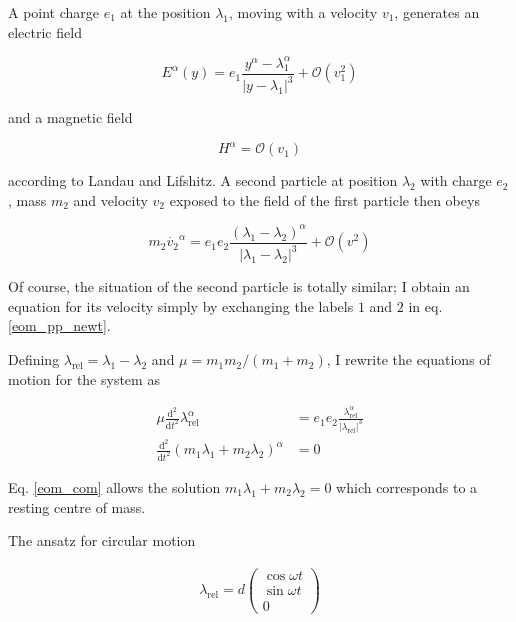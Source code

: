\documentclass[11pt]{article}
\begin{document}
A point charge $e_1$ at the position $\lambda_1$, moving with a velocity $v_1$, generates an electric field 

\begin{equation}
	E^\alpha(y) = e_1 \frac{y^\alpha - \lambda_1^\alpha }{\left| y - \lambda_1\right|^3} 
	+ \mathcal{O}\left(v_1^2 \right)
\end{equation}

and a magnetic field

\begin{equation}
	H^\alpha = \mathcal{O}\left(v_1 \right)
\end{equation}

according to Landau and Lifshitz. A second particle at position $\lambda_2$ with charge $e_2$, mass $m_2$ and velocity $v_2$ exposed to the field of the first particle then obeys 

\begin{equation} \label{eom_pp_newt}
	m_2 \dot{v_2}^\alpha = e_1 e_2 \frac{\left( \lambda_1 - \lambda_2\right)^\alpha}{\left| \lambda_1 - \lambda_2\right|^3} + \mathcal{O}\left(v^2\right)
\end{equation}

Of course, the situation of the second particle is totally similar; I obtain an equation for its velocity simply by exchanging the labels $1$ and $2$ in eq. \ref{eom_pp_newt}. 

Defining $\lambda_{\text{rel}} = \lambda_1 - \lambda_2$ and $\mu = m_1 m_2 / \left( m_1 + m_2 \right)$, I rewrite the equations of motion for the system as

\begin{align}
	\mu \frac{\mathrm{d}^2}{\mathrm{d}t^2} \lambda_{\text{rel}}^\alpha 
	&= e_1 e_2 \frac{\lambda_{\text{rel}}^\alpha}{\left| \lambda_{\text{rel}} \right|^3} \label{eom_rel}\\
	\frac{\mathrm{d}^2}{\mathrm{d}t^2} \left( m_1 \lambda_1 + m_2 \lambda_2 \right)^\alpha 
	&= 0 \label{eom_com}
\end{align}

Eq. \ref{eom_com} allows the solution $m_1 \lambda_1 + m_2 \lambda_2 = 0$ which corresponds to a resting centre of mass.

The ansatz for circular motion

\begin{align}
	\lambda_{\text{rel}}  
	= d\begin{pmatrix}
	\cos{\omega t}\\ \sin{\omega t}\\ 0
	\end{pmatrix}
\end{align}
\end{document}
